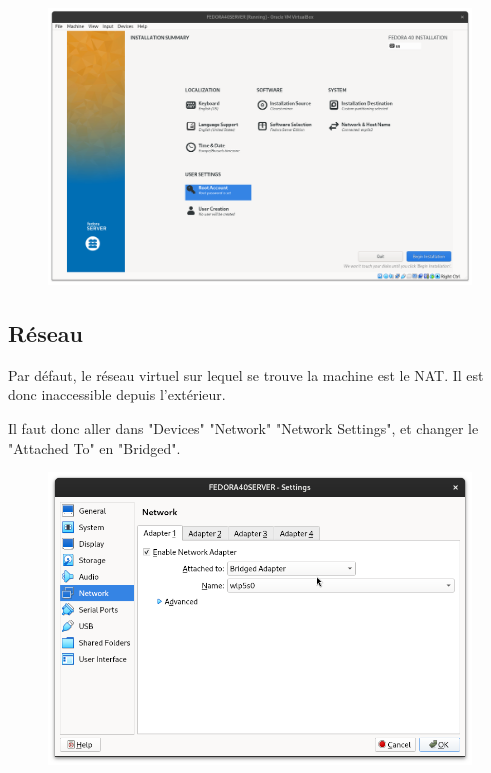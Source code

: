 \documentclass{article}
\begin{document}
\begin{figure}[h!]
		\centering
		\includegraphics[width=1\textwidth]{vbox16.png}
\end{figure}

\pagebreak

\subsection{Réseau}

Par défaut, le réseau virtuel sur lequel se trouve la machine est le NAT. Il est donc inaccessible depuis l'extérieur.

Il faut donc aller dans "Devices" \textrightarrow "Network" \textrightarrow "Network Settings", et changer le "Attached To" en "Bridged".


\begin{figure}[h!]
		\centering
		\includegraphics[width=1\textwidth]{vbox17.png}
\end{figure}
\end{document}
